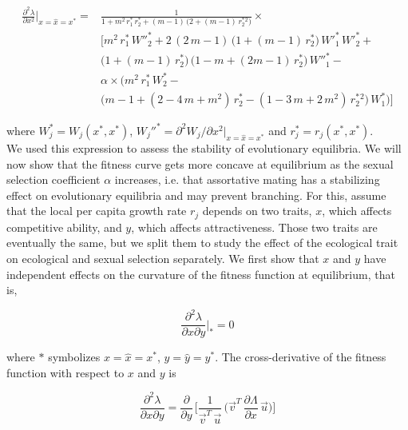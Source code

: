 \begin{equation}
    \begin{split}
        \frac{\partial^2 \lambda}{\partial x^2}\bigg|_{x=\hat x=x^*}=&\frac{1}{1 + m^2\,r^*_1\,r^*_2 + (m - 1)\,\big(2 + (m - 1)\,r^*_2^2\big)} \times \\
        &\Bigg[m^2\, r^*_ 1\, W''^*_2 + 2\, (2\, m - 1)\, \big(1 + (m - 1)\, r^*_ 2\big)\, W'^*_1 \, W'^*_2 +\\
        &\big(1 + (m - 1) \, r^*_ 2\big)\, \big(1 - m + (2 m - 1) \,r^*_ 2\big)\, W''^*_1 -\\
        &\alpha \times \Big(m^2\, r^*_ 1\, W^*_2 - \\
        & \big(m - 1 + (2 - 4\,m + m^2)\, r^*_ 2 - (1 - 3\,m + 2\,m^2)\,r^*_ 2^2\big)\,W^*_1 \Big)\Bigg]
    \end{split}
    \label{eq:fitness_curvature_equilibrium_expression}
\end{equation}

where $W_j^* = W_j(x^*, x^*)$, $W_j''^* = \partial^2 W_j / \partial x^2 |_{x=\hat{x}=x^*}$ and $r_j^* = r_j(x^*, x^*)$.\\

We used this expression to assess the stability of evolutionary equilibria. We will now show that the fitness curve gets more concave at equilibrium as the sexual selection coefficient $\alpha$ increases, i.e. that assortative mating has a stabilizing effect on evolutionary equilibria and may prevent branching. For this, assume that the local per capita growth rate $r_j$ depends on two traits, $x$, which affects competitive ability, and $y$, which affects attractiveness. Those two traits are eventually the same, but we split them to study the effect of the ecological trait on ecological and sexual selection separately. We first show that $x$ and $y$ have independent effects on the curvature of the fitness function at equilibrium, that is,

\begin{equation}
    \frac{\partial^2 \lambda}{\partial x \partial y}\bigg|_* = 0
\end{equation}

where $*$ symbolizes $x=\hat x=x^*$, $y=\hat y=y^*$. The cross-derivative of the fitness function with respect to $x$ and $y$ is

\begin{equation}
    \frac{\partial^2 \lambda}{\partial x \partial y} = \frac{\partial}{\partial y}\,\Bigg[\frac{1}{\overrightarrow{v}^T\,\overrightarrow{u}}\,\bigg( \overrightarrow{v}^T\,\frac{\partial \Lambda}{\partial x}\,\overrightarrow{u} \bigg)\Bigg]
\end{equation}


